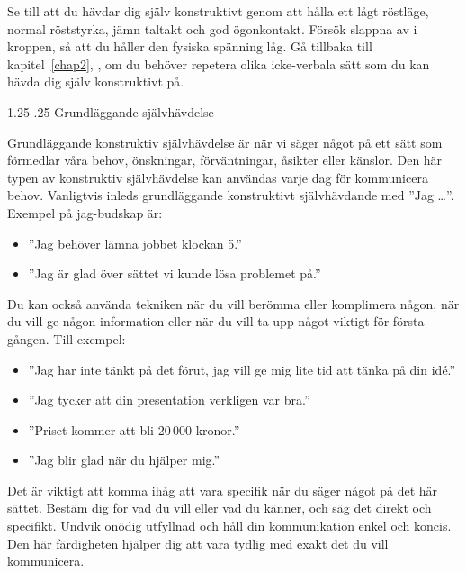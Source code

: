 \documentclass[swedish,a4paper]{book}
\makeatletter
\renewcommand\section{\@startsection{section}{1}{\z@}%
                                   {1.25\baselineskip}%
                                   {.25\baselineskip}%
                                   {\fontsize{1.25\baselineskip}{1.25\baselineskip}\selectfont\sffamily\bfseries}} %
\makeatother
\begin{document}
Se till att du hävdar dig själv konstruktivt genom att hålla ett lågt röstläge, normal röststyrka, jämn taltakt och god ögonkontakt. Försök slappna av i kroppen, så att du håller den fysiska spänning låg. Gå tillbaka till kapitel~\ref{chap2}, \textit{}, om du behöver repetera olika icke-verbala sätt som du kan hävda dig själv konstruktivt på.

\section{Grundläggande självhävdelse}

Grundläggande konstruktiv självhävdelse är när vi säger något på ett sätt som förmedlar våra behov, önskningar, förväntningar, åsikter eller känslor. Den här typen av konstruktiv självhävdelse kan användas varje dag för kommunicera behov. Vanligtvis inleds grundläggande konstruktivt självhävdande med ''Jag \ldots{}''. Exempel på jag-budskap är:

\begin{itemize}

\item ''Jag behöver lämna jobbet klockan 5.''

\item ''Jag är glad över sättet vi kunde lösa problemet på.''

\end{itemize}

Du kan också använda tekniken när du vill berömma eller komplimera någon, när du vill ge någon information eller när du vill ta upp något viktigt för första gången. Till exempel:

\begin{itemize}

\item ''Jag har inte tänkt på det förut, jag vill ge mig lite tid att tänka på din idé.''

\item ''Jag tycker att din presentation verkligen var bra.''

\item ''Priset kommer att bli 20\,000 kronor.''

\item ''Jag blir glad när du hjälper mig.''

\end{itemize}

Det är viktigt att komma ihåg att vara specifik när du säger något på det här sättet. Bestäm dig för vad du vill eller vad du känner, och säg det direkt och specifikt. Undvik onödig utfyllnad och håll din kommunikation enkel och koncis. Den här färdigheten hjälper dig att vara tydlig med exakt det du vill kommunicera.
\end{document}
